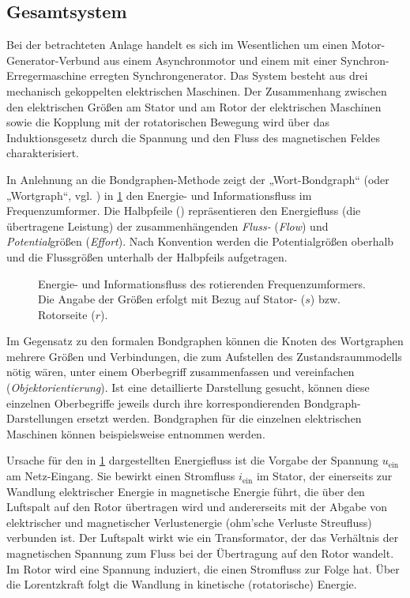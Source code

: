 \subsection{Gesamtsystem}\label{sec:gesamtsystem}

Bei der betrachteten Anlage handelt es sich im Wesentlichen um einen Motor-Generator-Verbund aus einem Asynchronmotor und einem mit einer Synchron-Erregermaschine erregten Synchrongenerator. Das System besteht aus drei mechanisch gekoppelten elektrischen Maschinen. Der Zusammenhang zwischen den elektrischen Größen am Stator und am Rotor der elektrischen Maschinen sowie die Kopplung mit der rotatorischen Bewegung wird über das Induktionsgesetz durch die Spannung und den Fluss des magnetischen Feldes charakterisiert.

In Anlehnung an die Bondgraphen-Methode zeigt der „Wort-Bondgraph“ (oder „Wortgraph“, vgl. \cite[S.~10]{roddeckBondgraphenModellbildungUnd2019}) in \cref{fig:Wirkungsgraph} den Energie- und Informationsfluss im Frequenzumformer. Die Halbpfeile (\bond) repräsentieren den Energiefluss (die übertragene Leistung) der zusammenhängenden \emph{Fluss-} (\emph{Flow}) und \emph{Potential}größen (\emph{Effort}). Nach Konvention werden die Potentialgrößen oberhalb und die Flussgrößen unterhalb der Halbpfeils aufgetragen. 

\begin{figure}
    \centering
    
    \caption{Energie- und Informationsfluss des rotierenden Frequenzumformers. Die Angabe der Größen erfolgt mit Bezug auf Stator- ($s$) bzw. Rotorseite ($r$).}
    \label{fig:Wirkungsgraph}
\end{figure}

Im Gegensatz zu den formalen Bondgraphen können die Knoten des Wortgraphen mehrere Größen und Verbindungen, die zum Aufstellen des Zustandsraummodells nötig wären, unter einem Oberbegriff zusammenfassen und vereinfachen (\emph{Objektorientierung}). Ist eine detaillierte Darstellung gesucht, können diese einzelnen Oberbegriffe jeweils durch ihre korrespondierenden Bondgraph-Darstellungen ersetzt werden. Bondgraphen für die einzelnen elektrischen Maschinen können beispielsweise \cite[S.~269~ff.]{borutzkyBondGraphModelling2011} entnommen werden.

Ursache für den in \cref{fig:Wirkungsgraph} dargestellten Energiefluss ist die Vorgabe der Spannung $u_{\mathrm{ein}}$ am Netz-Eingang. Sie bewirkt einen Stromfluss $i_{\mathrm{ein}}$ im Stator, der einerseits zur Wandlung elektrischer Energie in magnetische Energie führt, die über den Luftspalt auf den Rotor übertragen wird und andererseits mit der Abgabe von elektrischer und magnetischer Verlustenergie (ohm'sche Verluste Streufluss) verbunden ist. Der Luftspalt wirkt wie ein Transformator, der das Verhältnis der magnetischen Spannung zum Fluss bei der Übertragung auf den Rotor  wandelt. Im Rotor wird eine Spannung induziert, die einen Stromfluss zur Folge hat. Über die Lorentzkraft folgt die Wandlung in kinetische (rotatorische) Energie.

